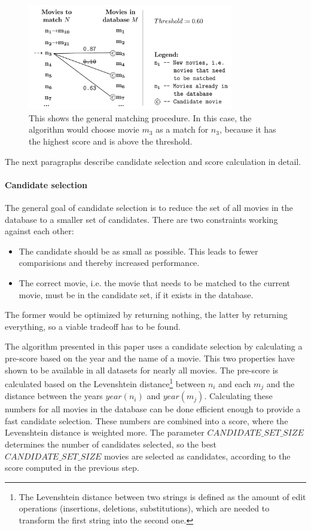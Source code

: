 \begin{figure}[ht]
  \begin{center}
  \includegraphics[width=0.8\textwidth]{images/matching_general.pdf}
  \end{center}
  \caption{This shows the general matching procedure. In this case, the algorithm would choose movie $m_3$ as a match for $n_3$, because it has the highest score and is above the threshold.}
  \label{fig_matching_general}
\end{figure}

The next paragraphs describe candidate selection and score calculation in detail.

\paragraph{Candidate selection}

The general goal of candidate selection is to reduce the set of all movies in the database to a smaller set of candidates.
There are two constraints working against each other:
\begin{itemize}
	\item The candidate should be as small as possible. This leads to fewer comparisions and thereby increased performance.
	\item The correct movie, i.e. the movie that needs to be matched to the current movie, must be in the candidate set, if it exists in the database.
\end{itemize}
The former would be optimized by returning nothing, the latter by returning everything, so a viable tradeoff has to be found.

The algorithm presented in this paper uses a candidate selection by calculating a pre-score based on the year and the name of a movie.
This two properties have shown to be available in all datasets for nearly all movies.
The pre-score is calculated based on the Levenshtein distance\footnote{The Levenshtein distance between two strings is defined as the amount of edit operations (insertions, deletions, substitutions), which are needed to transform the first string into the second one.} between $n_i$ and each $m_j$ and the distance between the years $year(n_i)$ and $year(m_j)$.
Calculating these numbers for all movies in the database can be done efficient enough to provide a fast candidate selection.
These numbers are combined into a score, where the Levenshtein distance is weighted more.
The parameter $CANDIDATE\_SET\_SIZE$ determines the number of candidates selected, so the best $CANDIDATE\_SET\_SIZE$ movies are selected as candidates, according to the score computed in the previous step.

